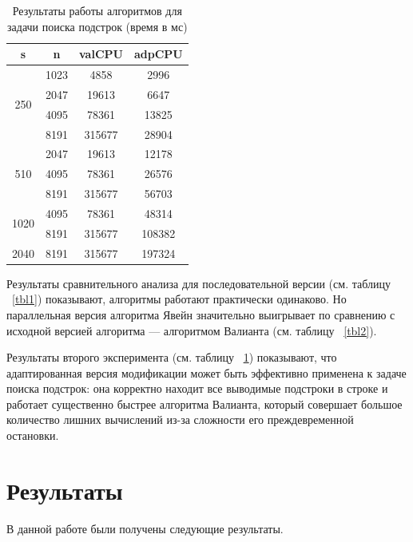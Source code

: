 \documentclass[14pt]{matmex-diploma-custom}
\begin{document}
\begin{table}[h]
\centering
\caption{Результаты работы алгоритмов для задачи поиска подстрок (время в мс)}
\label{tbl3}
    \begin{center}
        \begin{tabular}{ |c|c|c|c| } 
        \hline
        s & n & valCPU &  adpCPU \\
        \hline
        \multirow{4}{2em}{250} & 1023 & 4858 & 2996 \\ 
        & 2047 & 19613 & 6647 \\ 
        & 4095 & 78361 & 13825 \\ 
        & 8191 & 315677 & 28904 \\ 
        \hline
        \multirow{3}{2em}{510} & 2047 & 19613 & 12178 \\
        & 4095 & 78361 & 26576 \\
        & 8191 & 315677 & 56703 \\
        \hline
        \multirow{2}{2em}{1020} & 4095 & 78361 & 48314 \\
        & 8191 & 315677 & 108382 \\
        \hline
        \multirow{1}{2em}{2040} & 8191 & 315677 & 197324 \\
        \hline
        \end{tabular}
        
        
    \end{center}
\end{table}

\BlankLine
\BlankLine

Результаты сравнительного анализа для последовательной версии (см. таблицу ~\ref{tbl1}) показывают, алгоритмы работают практически одинаково. Но параллельная версия алгоритма Явейн значительно выигрывает по сравнению с исходной версией алгоритма --- алгоритмом Валианта (см. таблицу ~\ref{tbl2}).

Результаты второго эксперимента (см. таблицу ~\ref{tbl3}) показывают, что адаптированная версия модификации может быть эффективно применена к задаче поиска подстрок: она корректно находит все выводимые подстроки в строке и работает существенно быстрее алгоритма Валианта, который совершает большое количество лишних вычислений из-за сложности его преждевременной остановки.

\section{Результаты}
В данной работе были получены следующие результаты.
\end{document}
